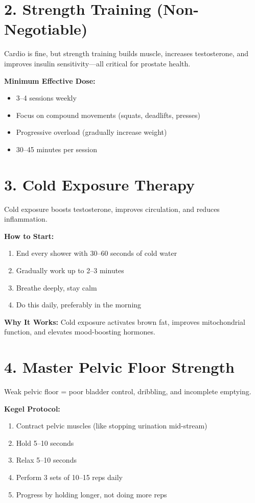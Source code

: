 \documentclass[11pt,oneside,openany]{book}
\begin{document}
\section*{2. Strength Training (Non-Negotiable)}
Cardio is fine, but strength training builds muscle, increases testosterone, and improves insulin sensitivity---all critical for prostate health.

\textbf{Minimum Effective Dose:}
\begin{itemize}[leftmargin=*]
\item 3--4 sessions weekly
\item Focus on compound movements (squats, deadlifts, presses)
\item Progressive overload (gradually increase weight)
\item 30--45 minutes per session
\end{itemize}

\section*{3. Cold Exposure Therapy}
Cold exposure boosts testosterone, improves circulation, and reduces inflammation.

\textbf{How to Start:}
\begin{enumerate}
\item End every shower with 30--60 seconds of cold water
\item Gradually work up to 2--3 minutes
\item Breathe deeply, stay calm
\item Do this daily, preferably in the morning
\end{enumerate}

\textbf{Why It Works:} Cold exposure activates brown fat, improves mitochondrial function, and elevates mood-boosting hormones.

\section*{4. Master Pelvic Floor Strength}
Weak pelvic floor = poor bladder control, dribbling, and incomplete emptying.

\textbf{Kegel Protocol:}
\begin{enumerate}
\item Contract pelvic muscles (like stopping urination mid-stream)
\item Hold 5--10 seconds
\item Relax 5--10 seconds
\item Perform 3 sets of 10--15 reps daily
\item Progress by holding longer, not doing more reps
\end{enumerate}
\end{document}
